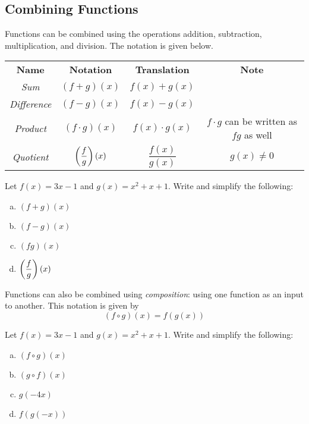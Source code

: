 \documentclass[notes]{subfiles}
\begin{document}
	\subsection*{Combining Functions}
		Functions can be combined using the operations addition, subtraction, multiplication, and division. The notation is given below.
		\begin{center}
			\begin{tabular}{cccc}
				\textbf{Name} & \textbf{Notation} & \textbf{Translation} & \textbf{Note}\\
				\emph{Sum} & \((f+g)(x)\) & \(f(x) + g(x)\) & \\
				\emph{Difference} & \((f-g)(x)\) & \(f(x) - g(x)\) & \\
				\emph{Product} & \((f\cdot g)(x)\) & \(f(x)\cdot g(x)\) & \(f\cdot g\) can be written as \(fg\) as well \\
				\emph{Quotient} & \(\left( \dfrac{f}{g}\right)(x)\) & \(\dfrac{f(x)}{g(x)}\) & \(g(x)\neq 0\)
			\end{tabular}
		\end{center}	
		
		\begin{ex}
			Let \(f(x) = 3x - 1\) and \(g(x) = x^2 + x +1\). Write and simplify the following:
			\begin{enumerate}[(a)]
				\item \((f+g)(x)\)
					
				\item \((f-g)(x)\)
					
				\item \((fg)(x)\)
					
				\item \(\left( \dfrac{f}{g}\right)(x)\)
			\end{enumerate}
		\end{ex}
			\newpage
		
		Functions can also be combined using \emph{composition}: using one function as an input to another. This notation is given by
			\[(f\circ g)(x) = f(g(x))\]	
		\begin{ex}
			Let \(f(x) = 3x - 1\) and \(g(x) = x^2 + x +1\). Write and simplify the following:
			\begin{enumerate}[(a)]
				\item \((f\circ g)(x)\)
					\vs{1}
					
				\item \((g\circ f)(x)\)
					\vs{1}
					
				\item \(g(-4x)\)
					\vs{1}
					
				\item \(f(g(-x))\)
					\vs{1}
			\end{enumerate}
		\end{ex}
		
\end{document}
